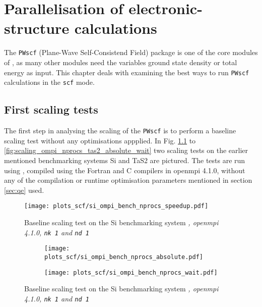 \documentclass[main.tex]{subfiles}
\begin{document}
\chapter{Parallelisation of electronic-structure calculations\label{ch:optimisation_scf}}

The \texttt{PWscf} (Plane-Wave Self-Consistend Field) package is one of the core modules of \QE, as many other modules need the variables ground state density or total energy as input.
This chapter deals with examining the best ways to run \texttt{PWscf} calculations in the \texttt{scf} mode.

\section{First scaling tests}\label{sec:scf_first_scaling}

The first step in analysing the scaling of the \texttt{PWscf} is to perform a baseline scaling test without any optimisations appplied. 
In Fig. \ref{fig:scaling_ompi_nprocs_si_speedup} to \ref{fig:scaling_ompi_nprocs_tas2_absolute_wait} two scaling tests on the earlier mentioned benchmarking systems Si and TaS2 are pictured. 
The tests are run using , compiled using the Fortran and C compilers in \gls{openmpi} 4.1.0, without any of the compilation or runtime optimisation parameters mentioned in section \ref{sec:qe} used.

\begin{figure}[ht!]
\centering
\texttt{[image: plots\_scf/si\_ompi\_bench\_nprocs\_speedup.pdf]}
\caption{Baseline scaling test on the Si benchmarking system \emph{, \gls{openmpi} 4.1.0, \texttt{nk 1} and \texttt{nd 1}}}
\label{fig:scaling_ompi_nprocs_si_speedup}
\end{figure}

\begin{figure}[ht!]
\begin{subfigure}[b]{0.49\textwidth}
    \centering
    \texttt{[image: plots\_scf/si\_ompi\_bench\_nprocs\_absolute.pdf]}
\end{subfigure}
\begin{subfigure}[b]{0.49\textwidth}
    \centering
    \texttt{[image: plots\_scf/si\_ompi\_bench\_nprocs\_wait.pdf]}
\end{subfigure}
\caption{Baseline scaling test on the Si benchmarking system \emph{, \gls{openmpi} 4.1.0, \texttt{nk 1} and \texttt{nd 1}}}
\label{fig:scaling_ompi_nprocs_si_absolute_wait}
\end{figure}
\end{document}
